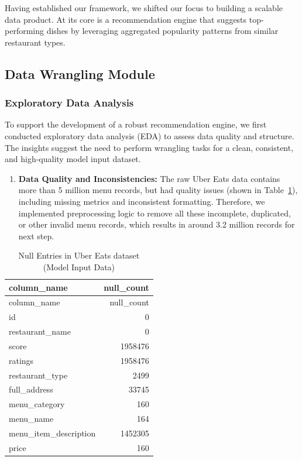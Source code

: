 \documentclass[
  11pt,
  a4paper,
  DIV=11,
  numbers=noendperiod]{scrartcl}
\providecommand{\tightlist}{%
  \setlength{\itemsep}{0pt}\setlength{\parskip}{0pt}}\usepackage{longtable,booktabs,array}
\begin{document}
Having established our framework, we shifted our focus to building a
scalable data product. At its core is a recommendation engine that
suggests top-performing dishes by leveraging aggregated popularity
patterns from similar restaurant types.

\subsection{Data Wrangling Module}\label{data-wrangling-module}

\subsubsection{Exploratory Data
Analysis}\label{exploratory-data-analysis}

To support the development of a robust recommendation engine, we first
conducted exploratory data analysis (EDA) to assess data quality and
structure. The insights suggest the need to perform wrangling tasks for
a clean, consistent, and high-quality model input dataset.

\begin{enumerate}
\def\labelenumi{\arabic{enumi}.}
\tightlist
\item
  \textbf{Data Quality and Inconsistencies:} The raw Uber Eats data
  contains more than 5 million menu records, but had quality issues
  (shown in Table~\ref{tbl-null-entries}), including missing metrics and
  inconsistent formatting. Therefore, we implemented preprocessing logic
  to remove all these incomplete, duplicated, or other invalid menu
  records, which results in around 3.2 million records for next step.
\end{enumerate}

\begin{longtable}[]{@{}lr@{}}
\caption{Null Entries in Uber Eats dataset (Model Input
Data)}\label{tbl-null-entries}\tabularnewline
\toprule\noalign{}
column\_name & null\_count \\
\midrule\noalign{}
\endfirsthead
\toprule\noalign{}
column\_name & null\_count \\
\midrule\noalign{}
\endhead
\bottomrule\noalign{}
\endlastfoot
id & 0 \\
restaurant\_name & 0 \\
score & 1958476 \\
ratings & 1958476 \\
restaurant\_type & 2499 \\
full\_address & 33745 \\
menu\_category & 160 \\
menu\_name & 164 \\
menu\_item\_description & 1452305 \\
price & 160 \\
\end{longtable}
\end{document}
